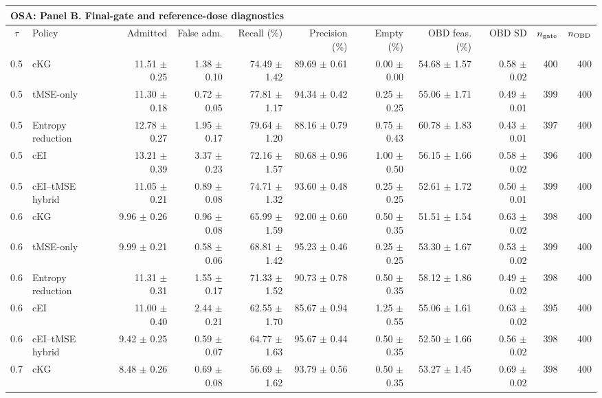 \begin{tabular}{@{}clrrrrrrrrr@{}}
\multicolumn{11}{l}{\textbf{OSA: Panel B. Final-gate and reference-dose diagnostics}} \\
\toprule
$\tau$ & Policy & Admitted & False adm. & Recall (\%) & Precision (\%) & Empty (\%) & OBD feas. (\%) & OBD SD & $n_{\rm gate}$ & $n_{\rm OBD}$ \\
\midrule
0.5 & cKG & 11.51 $\pm$ 0.25 & 1.38 $\pm$ 0.10 & 74.49 $\pm$ 1.42 & 89.69 $\pm$ 0.61 & 0.00 $\pm$ 0.00 & 54.68 $\pm$ 1.57 & 0.58 $\pm$ 0.02 & 400 & 400 \\
0.5 & tMSE-only & 11.30 $\pm$ 0.18 & 0.72 $\pm$ 0.05 & 77.81 $\pm$ 1.17 & 94.34 $\pm$ 0.42 & 0.25 $\pm$ 0.25 & 55.06 $\pm$ 1.71 & 0.49 $\pm$ 0.01 & 399 & 400 \\
0.5 & Entropy reduction & 12.78 $\pm$ 0.27 & 1.95 $\pm$ 0.17 & 79.64 $\pm$ 1.20 & 88.16 $\pm$ 0.79 & 0.75 $\pm$ 0.43 & 60.78 $\pm$ 1.83 & 0.43 $\pm$ 0.01 & 397 & 400 \\
0.5 & cEI & 13.21 $\pm$ 0.39 & 3.37 $\pm$ 0.23 & 72.16 $\pm$ 1.57 & 80.68 $\pm$ 0.96 & 1.00 $\pm$ 0.50 & 56.15 $\pm$ 1.66 & 0.58 $\pm$ 0.02 & 396 & 400 \\
0.5 & cEI--tMSE hybrid & 11.05 $\pm$ 0.21 & 0.89 $\pm$ 0.08 & 74.71 $\pm$ 1.32 & 93.60 $\pm$ 0.48 & 0.25 $\pm$ 0.25 & 52.61 $\pm$ 1.72 & 0.50 $\pm$ 0.01 & 399 & 400 \\
0.6 & cKG & 9.96 $\pm$ 0.26 & 0.96 $\pm$ 0.08 & 65.99 $\pm$ 1.59 & 92.00 $\pm$ 0.60 & 0.50 $\pm$ 0.35 & 51.51 $\pm$ 1.54 & 0.63 $\pm$ 0.02 & 398 & 400 \\
0.6 & tMSE-only & 9.99 $\pm$ 0.21 & 0.58 $\pm$ 0.06 & 68.81 $\pm$ 1.42 & 95.23 $\pm$ 0.46 & 0.25 $\pm$ 0.25 & 53.30 $\pm$ 1.67 & 0.53 $\pm$ 0.02 & 399 & 400 \\
0.6 & Entropy reduction & 11.31 $\pm$ 0.31 & 1.55 $\pm$ 0.17 & 71.33 $\pm$ 1.52 & 90.73 $\pm$ 0.78 & 0.50 $\pm$ 0.35 & 58.12 $\pm$ 1.86 & 0.49 $\pm$ 0.02 & 398 & 400 \\
0.6 & cEI & 11.00 $\pm$ 0.40 & 2.44 $\pm$ 0.21 & 62.55 $\pm$ 1.70 & 85.67 $\pm$ 0.94 & 1.25 $\pm$ 0.55 & 55.06 $\pm$ 1.61 & 0.63 $\pm$ 0.02 & 395 & 400 \\
0.6 & cEI--tMSE hybrid & 9.42 $\pm$ 0.25 & 0.59 $\pm$ 0.07 & 64.77 $\pm$ 1.63 & 95.67 $\pm$ 0.44 & 0.50 $\pm$ 0.35 & 52.50 $\pm$ 1.66 & 0.56 $\pm$ 0.02 & 398 & 400 \\
0.7 & cKG & 8.48 $\pm$ 0.26 & 0.69 $\pm$ 0.08 & 56.69 $\pm$ 1.62 & 93.79 $\pm$ 0.56 & 0.50 $\pm$ 0.35 & 53.27 $\pm$ 1.45 & 0.69 $\pm$ 0.02 & 398 & 400 \\

\end{tabular}
